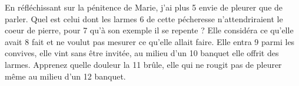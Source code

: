 En réfléchissant sur la pénitence de Marie, j'ai plus	 
5	 	envie de pleurer que de parler. Quel est celui dont les larmes	 
6	 	de cette pécheresse n'attendriraient le coeur de pierre, pour	 
7	 	qu'à son exemple il se repente ? Elle considéra ce qu'elle avait	 
8	 	fait et ne voulut pas mesurer ce qu'elle allait faire. Elle entra	 
9	 	parmi les convives, elle vint sans être invitée, au milieu d'un	 
10	 	banquet elle offrit des larmes. Apprenez quelle douleur la	 
11	 	brûle, elle qui ne rougit pas de pleurer même au milieu d'un	 
12	 	banquet.